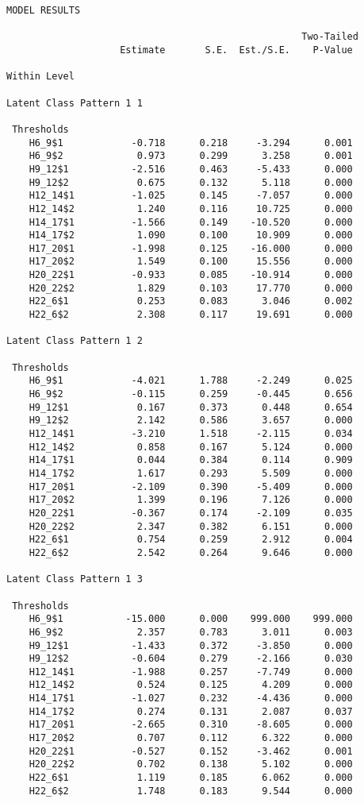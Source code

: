 \documentclass[]{article}
\begin{document}
\begin{verbatim}
MODEL RESULTS

                                                    Two-Tailed
                    Estimate       S.E.  Est./S.E.    P-Value

Within Level

Latent Class Pattern 1 1

 Thresholds
    H6_9$1            -0.718      0.218     -3.294      0.001
    H6_9$2             0.973      0.299      3.258      0.001
    H9_12$1           -2.516      0.463     -5.433      0.000
    H9_12$2            0.675      0.132      5.118      0.000
    H12_14$1          -1.025      0.145     -7.057      0.000
    H12_14$2           1.240      0.116     10.725      0.000
    H14_17$1          -1.566      0.149    -10.520      0.000
    H14_17$2           1.090      0.100     10.909      0.000
    H17_20$1          -1.998      0.125    -16.000      0.000
    H17_20$2           1.549      0.100     15.556      0.000
    H20_22$1          -0.933      0.085    -10.914      0.000
    H20_22$2           1.829      0.103     17.770      0.000
    H22_6$1            0.253      0.083      3.046      0.002
    H22_6$2            2.308      0.117     19.691      0.000

Latent Class Pattern 1 2

 Thresholds
    H6_9$1            -4.021      1.788     -2.249      0.025
    H6_9$2            -0.115      0.259     -0.445      0.656
    H9_12$1            0.167      0.373      0.448      0.654
    H9_12$2            2.142      0.586      3.657      0.000
    H12_14$1          -3.210      1.518     -2.115      0.034
    H12_14$2           0.858      0.167      5.124      0.000
    H14_17$1           0.044      0.384      0.114      0.909
    H14_17$2           1.617      0.293      5.509      0.000
    H17_20$1          -2.109      0.390     -5.409      0.000
    H17_20$2           1.399      0.196      7.126      0.000
    H20_22$1          -0.367      0.174     -2.109      0.035
    H20_22$2           2.347      0.382      6.151      0.000
    H22_6$1            0.754      0.259      2.912      0.004
    H22_6$2            2.542      0.264      9.646      0.000

Latent Class Pattern 1 3

 Thresholds
    H6_9$1           -15.000      0.000    999.000    999.000
    H6_9$2             2.357      0.783      3.011      0.003
    H9_12$1           -1.433      0.372     -3.850      0.000
    H9_12$2           -0.604      0.279     -2.166      0.030
    H12_14$1          -1.988      0.257     -7.749      0.000
    H12_14$2           0.524      0.125      4.209      0.000
    H14_17$1          -1.027      0.232     -4.436      0.000
    H14_17$2           0.274      0.131      2.087      0.037
    H17_20$1          -2.665      0.310     -8.605      0.000
    H17_20$2           0.707      0.112      6.322      0.000
    H20_22$1          -0.527      0.152     -3.462      0.001
    H20_22$2           0.702      0.138      5.102      0.000
    H22_6$1            1.119      0.185      6.062      0.000
    H22_6$2            1.748      0.183      9.544      0.000


\end{verbatim}
\end{document}
